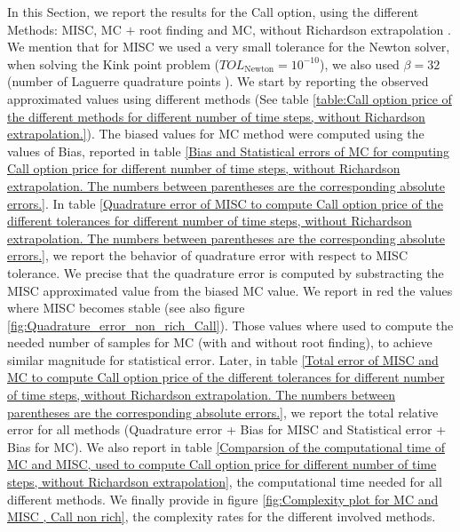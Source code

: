 \documentclass[11pt]{article}
\begin{document}
In this Section, we report the results for the Call option, using the different Methods: MISC, MC $+$ root finding  and MC, without Richardson extrapolation . We mention that for MISC we used a very small tolerance for the Newton solver, when solving the Kink point problem ($TOL_{\text{Newton}}=10^{-10}$), we also used $\beta=32$ (number of Laguerre quadrature points ). We start by reporting the observed approximated values using different methods (See table \ref{table:Call option price of the different methods for different number of time steps, without Richardson extrapolation.}). The biased values for MC method were computed using the values of Bias, reported in table \ref{Bias and Statistical errors of MC  for computing Call option price  for different number of time steps, without Richardson extrapolation. The numbers between parentheses are the corresponding absolute errors.}. In table \ref{Quadrature error of MISC to compute Call option price of the different tolerances for different number of time steps, without Richardson extrapolation. The numbers between parentheses are the corresponding absolute errors.}, we report the behavior of quadrature error with respect to MISC tolerance. We precise that the quadrature error is computed by substracting the MISC approximated value from the biased MC value. We report in red the values where MISC becomes stable (see also figure \ref{fig:Quadrature_error_non_rich_Call}). Those values where used to compute the needed number of samples for MC (with and without root finding), to achieve similar magnitude  for statistical error. Later, in table \ref{Total error of MISC and MC to compute Call option price of the different tolerances for different number of time steps, without Richardson extrapolation. The numbers between parentheses are the corresponding absolute errors.}, we report the total relative error for all methods (Quadrature error + Bias for MISC and Statistical error + Bias for MC). We also report in table \ref{Comparsion of the computational time of  MC and MISC, used to compute Call option price  for different number of time steps, without Richardson extrapolation}, the computational time needed for all different methods.  We finally provide in figure \ref{fig:Complexity plot for MC and MISC , Call non rich}, the complexity rates for the different involved methods.
\end{document}
